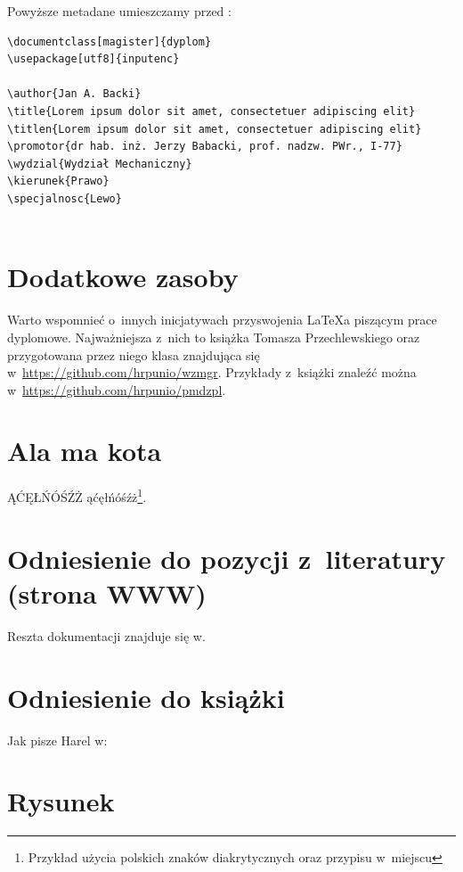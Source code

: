 \begin{enumerate}
\begin{itemize}
\end{itemize}
Powyższe metadane umieszczamy przed \verb||:
\begin{verbatim}
\documentclass[magister]{dyplom}
\usepackage[utf8]{inputenc}

\author{Jan A. Backi}
\title{Lorem ipsum dolor sit amet, consectetuer adipiscing elit}
\titlen{Lorem ipsum dolor sit amet, consectetuer adipiscing elit}
\promotor{dr hab. inż. Jerzy Babacki, prof. nadzw. PWr., I-77}
\wydzial{Wydział Mechaniczny}
\kierunek{Prawo}
\specjalnosc{Lewo}


\end{verbatim}

\end{enumerate}

\section{Dodatkowe zasoby}

Warto wspomnieć  o~innych inicjatywach przyswojenia LaTeX{}a piszącym prace dyplomowe. Najważniejsza z~nich to książka Tomasza Przechlewskiego\cite{tp-11-latex} oraz przygotowana przez niego klasa znajdująca się w~\url{https://github.com/hrpunio/wzmgr}. Przykłady z~książki znaleźć można w~\url{https://github.com/hrpunio/pmdzpl}.


\section{Ala ma kota}

ĄĆĘŁŃÓŚŹŻ ąćęłńóśźż\footnote{Przykład użycia polskich znaków diakrytycznych oraz przypisu w~miejscu}. \lipsum[1]

\section{Odniesienie do pozycji z~literatury (strona WWW)}

Reszta dokumentacji znajduje się w\cite{docker_compose_reference}. \lipsum[3]

\section{Odniesienie do książki}

Jak pisze Harel w\cite{harel_rzecz_2008}: \lipsum[7]

\section{Rysunek}

